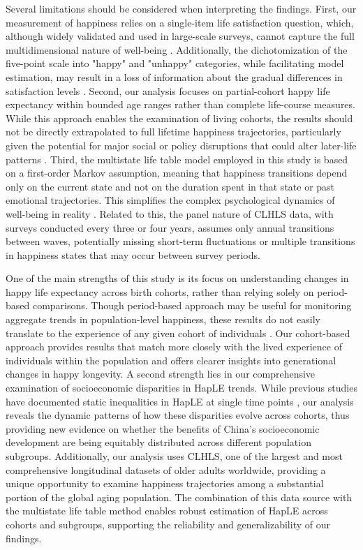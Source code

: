 \documentclass[12pt, a4paper]{article}
\begin{document}
Several limitations should be considered when interpreting the findings. First, our measurement of happiness relies on a single-item life satisfaction question, which, although widely validated and used in large-scale surveys, cannot capture the full multidimensional nature of well-being \autocite{george.2010.still}. Additionally, the dichotomization of the five-point scale into "happy" and "unhappy" categories, while facilitating model estimation, may result in a loss of information about the gradual differences in satisfaction levels \autocite{wan.2024.socioeconomic}. Second, our analysis focuses on partial-cohort happy life expectancy within bounded age ranges rather than complete life-course measures. While this approach enables the examination of living cohorts, the results should not be directly extrapolated to full lifetime happiness trajectories, particularly given the potential for major social or policy disruptions that could alter later-life patterns \autocite{payne.2022.expansion}. Third, the multistate life table model employed in this study is based on a first-order Markov assumption, meaning that happiness transitions depend only on the current state and not on the duration spent in that state or past emotional trajectories. This simplifies the complex psychological dynamics of well-being in reality \autocite{payne.2022.expansion,shen.2023.disability}. Related to this, the panel nature of CLHLS data, with surveys conducted every three or four years, assumes only annual transitions between waves, potentially missing short-term fluctuations or multiple transitions in happiness states that may occur between survey periods.

One of the main strengths of this study is its focus on understanding changes in happy life expectancy across birth cohorts, rather than relying solely on period-based comparisons. Though period-based approach may be useful for monitoring aggregate trends in population-level happiness, these results do not easily translate to the experience of any given cohort of individuals \autocite{payne.2022.expansion}. Our cohort-based approach provides results that match more closely with the lived experience of individuals within the population and offers clearer insights into generational changes in happy longevity. A second strength lies in our comprehensive examination of socioeconomic disparities in HapLE trends. While previous studies have documented static inequalities in HapLE at single time points \autocite{wan.2024.socioeconomic}, our analysis reveals the dynamic patterns of how these disparities evolve across cohorts, thus providing new evidence on whether the benefits of China's socioeconomic development are being equitably distributed across different population subgroups. Additionally, our analysis uses CLHLS, one of the largest and most comprehensive longitudinal datasets of older adults worldwide, providing a unique opportunity to examine happiness trajectories among a substantial portion of the global aging population. The combination of this data source with the multistate life table method enables robust estimation of HapLE across cohorts and subgroups, supporting the reliability and generalizability of our findings.
\end{document}
